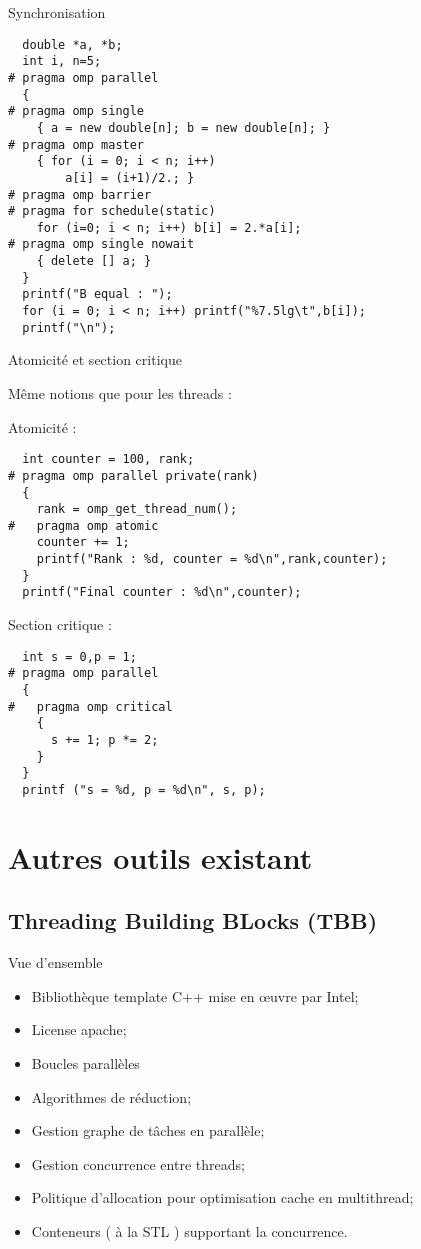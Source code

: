 \documentclass[handout,francais]{beamer}
\begin{document}
\begin{frame}[fragile]{Synchronisation}
 
\begin{lstlisting}
  double *a, *b;
  int i, n=5;
# pragma omp parallel
  {
# pragma omp single
    { a = new double[n]; b = new double[n]; }
# pragma omp master
    { for (i = 0; i < n; i++)
        a[i] = (i+1)/2.; }
# pragma omp barrier
# pragma for schedule(static)
    for (i=0; i < n; i++) b[i] = 2.*a[i];
# pragma omp single nowait
    { delete [] a; }
  }
  printf("B equal : ");
  for (i = 0; i < n; i++) printf("%7.5lg\t",b[i]);
  printf("\n");
\end{lstlisting}

\end{frame}

\begin{frame}[fragile]{Atomicité et section critique}

{\scriptsize
Même notions que pour les threads :

Atomicité :
 \begin{lstlisting}
  int counter = 100, rank;
# pragma omp parallel private(rank)
  {
    rank = omp_get_thread_num();
#   pragma omp atomic
    counter += 1;    
    printf("Rank : %d, counter = %d\n",rank,counter);
  }
  printf("Final counter : %d\n",counter);
\end{lstlisting}

Section critique :
\begin{lstlisting}
  int s = 0,p = 1;
# pragma omp parallel
  {
#   pragma omp critical
    {
      s += 1; p *= 2;
    }
  }
  printf ("s = %d, p = %d\n", s, p);
\end{lstlisting}
}

\end{frame}

\section{Autres outils existant}

\subsection{Threading Building BLocks (TBB)}

\begin{frame}[fragile]{Vue d'ensemble}

\begin{itemize}
 \item Bibliothèque template C++ mise en {\oe}uvre par Intel;
 \item License apache;
 \item Boucles parallèles
 \item Algorithmes de réduction;
 \item Gestion graphe de tâches en parallèle;
 \item Gestion concurrence entre threads;
 \item Politique d'allocation pour optimisation cache en multithread;
 \item Conteneurs ( à la STL ) supportant la concurrence.
\end{itemize}

\end{frame}
\end{document}
